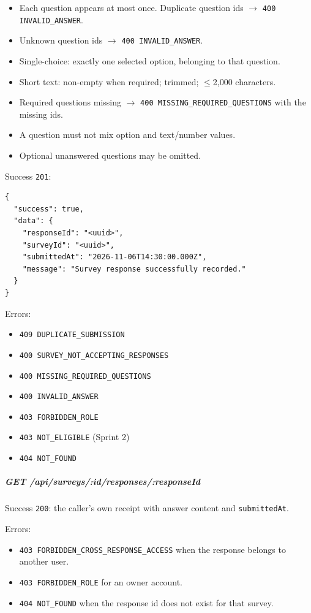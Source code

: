 \documentclass[12pt,a4paper]{article}
\begin{document}
\begin{itemize}[leftmargin=*]
\item Each question appears at most once. Duplicate question ids $\rightarrow$ \texttt{400 INVALID\_ANSWER}.
\item Unknown question ids $\rightarrow$ \texttt{400 INVALID\_ANSWER}.
\item Single-choice: exactly one selected option, belonging to that question.
\item Short text: non-empty when required; trimmed; $\leq$2,000 characters.
\item Required questions missing $\rightarrow$ \texttt{400 MISSING\_REQUIRED\_QUESTIONS} with the missing ids.
\item A question must not mix option and text/number values.
\item Optional unanswered questions may be omitted.
\end{itemize}

Success \texttt{201}:

\begin{lstlisting}
{
  "success": true,
  "data": {
    "responseId": "<uuid>",
    "surveyId": "<uuid>",
    "submittedAt": "2026-11-06T14:30:00.000Z",
    "message": "Survey response successfully recorded."
  }
}
\end{lstlisting}

Errors:

\begin{itemize}[leftmargin=*]
\item \texttt{409 DUPLICATE\_SUBMISSION}
\item \texttt{400 SURVEY\_NOT\_ACCEPTING\_RESPONSES}
\item \texttt{400 MISSING\_REQUIRED\_QUESTIONS}
\item \texttt{400 INVALID\_ANSWER}
\item \texttt{403 FORBIDDEN\_ROLE}
\item \texttt{403 NOT\_ELIGIBLE} (Sprint 2)
\item \texttt{404 NOT\_FOUND}
\end{itemize}

\subparagraph*{GET /api/surveys/:id/responses/:responseId}
Success \texttt{200}: the caller's own receipt with answer content and \texttt{submittedAt}.

Errors:

\begin{itemize}[leftmargin=*]
\item \texttt{403 FORBIDDEN\_CROSS\_RESPONSE\_ACCESS} when the response belongs to another user.
\item \texttt{403 FORBIDDEN\_ROLE} for an owner account.
\item \texttt{404 NOT\_FOUND} when the response id does not exist for that survey.
\end{itemize}
\end{document}
